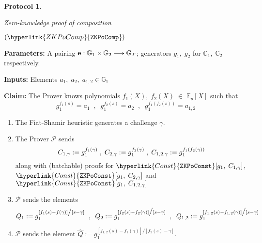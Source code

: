 \documentclass[11pt, lettersize, notitlepage, leqno, footskip=0.6cm]{article}
\newcommand{\bFp}{\mathbb{F}_p}
\newcommand{\lra}{\longrightarrow}
\newcommand{\mc}{\mathcal}
\newcommand{\mb}{\mathbb}
\newcommand{\what}{\widehat}
\newcommand{\mP}{\mc{P}}
\newcommand{\vs}{\vspace{-0.15cm}}
\newcommand{\noin}{\noindent}
\newtheorem{Prot}[Thm]{Protocol}
\numberwithin{equation}{section}
\begin{document}
\begin{mdframed}
\begin{Prot} \hypertarget{Comp}{Zero-knowledge proof of composition} $(\hyperlink{ZKPoComp}{\tt{ZKPoComp}})$\end{Prot}  

\noin \textbf{Parameters:} A pairing ${\bf{e}}:\mb{G}_1\times \mb{G}_2\lra \mb{G}_T$; generators $g_1,\;g_2$ for $\mb{G}_1,\; \mb{G}_2$ respectively.


\noindent \textbf{Inputs:} Elements $a_1,\;a_2,\;a_{1,2}\in \mb{G}_1$

\noindent \textbf{Claim:} The Prover knows polynomials $f_1(X),\; f_2(X)\;\in\; \bFp[X]$ such that $$g_1^{f_1(s)} = a_1\;\;,\;\;g_1^{f_2(s)} = a_2\;\;,\;\;g_1^{f_1(f_2(s))} = a_{1,2}$$ 

\begin{enumerate}[wide, labelwidth=!, labelindent=0pt, itemsep=-0.2ex]

\item The Fiat-Shamir heuristic generates a challenge $\gamma$.

\item The Prover $\mP$ sends \vs $$ C_{1,\gamma}:= g_1^{f_1(\gamma)}\;,\;C_{2,\gamma}:= g_1^{f_2(\gamma)}\;,\;C_{{1,2},\gamma}:= g_1^{f_1(f_2(\gamma))} \vs $$ along with (batchable) proofs for $\hyperlink{Const}{\tt{ZKPoConst}}[g_1,\;C_{{1},\gamma}]$, $\hyperlink{Const}{\tt{ZKPoConst}}[g_1,\;C_{{2},\gamma}]$ and\\ $\hyperlink{Const}{\tt{ZKPoConst}}[g_1,\;C_{{1,2},\gamma}]$ 


\item $\mP$ sends the elements \vs $$ Q_1:= g_1^{[f_1(s)-f(\gamma)]\big/[s-\gamma]}\;\;,\;\;Q_2:= g_1^{[f_{2}(s)-f_2(\gamma)]\big/[s-\gamma]}\;\;,\;\;Q_{1,2}:= g_1^{[f_{1,2}(s)-f_{1,2}(\gamma)]\big/[s-\gamma]} \vs $$ 

\item $\mP$ sends the element $\what{Q}:= g_1^{[f_{1,2}(s)-f_{1}(\gamma)]\big/[f_2(s)-\gamma]}$.



\end{enumerate}
\end{mdframed}
\end{document}
